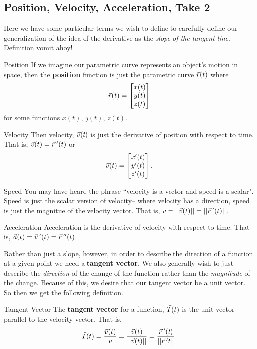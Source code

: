 \subsection{Position, Velocity, Acceleration, Take 2}
Here we have some particular terms we wish to define to carefully define our generalization of the idea of the derivative as the \textit{slope of the tangent line}. Definition vomit ahoy!

\begin{definition}{Position}
If we imagine our parametric curve represents an object's motion in space, then the \textbf{position} function is just the parametric curve $\vec{r}(t)$ where $$ \vec{r}(t)=\begin{bmatrix}x(t)\\y(t)\\z(t)\end{bmatrix}$$ for some functions $x(t)$, $y(t)$, $z(t)$.
\end{definition}

\begin{definition}{Velocity}
Then velocity, $\vec{v}(t)$ is just the derivative of position with respect to time. That is, $\vec{v}(t)=\vec{r}\hspace{0.2em}'(t)$ or $$\vec{v}(t)=\begin{bmatrix}x'(t)\\y'(t)\\z'(t)\end{bmatrix}.$$
\end{definition}

\begin{definition}{Speed}
You may have heard the phrase ``velocity is a vector and speed is a scalar". Speed is just the scalar version of velocity-- where velocity has a direction, speed is just the magnitue of the velocity vector. That is, $v=||\vec{v}(t)||=||\vec{r}\hspace{0.2em}'(t)||.$
\end{definition}

\begin{definition}{Acceleration}
Acceleration is the derivative of velocity with respect to time. That is, $\vec{a}(t)=\vec{v}\hspace{0.2em}'(t)=\vec{r}\hspace{0.2em}''(t)$.
\end{definition}

Rather than just a slope, however, in order to describe the direction of a function at a given point we need a \textbf{tangent vector}. We also generally wish to just describe the \textit{direction} of the change of the function rather than the \textit{magnitude} of the change. Because of this, we desire that our tangent vector be a unit vector. So then we get the following definition.

\begin{definition}{Tangent Vector}
The \textbf{tangent vector} for a function, $\vec{T}(t)$ is the unit vector parallel to the velocity vector. That is, $$\vec{T}(t)=\frac{\vec{v}(t)}{v}=\frac{\vec{v}(t)}{||\vec{v}(t)||}=\frac{\vec{r}\hspace{0.2em}'(t)}{||\vec{r}\hspace{0.2em}'{t}||}. $$
\end{definition}


